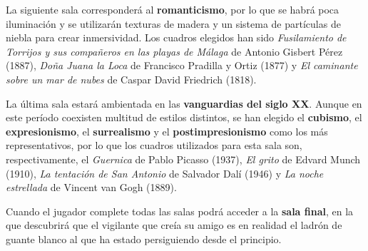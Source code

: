 La siguiente sala corresponderá al \textbf{romanticismo}, por lo que se habrá poca iluminación y se utilizarán texturas de madera y un sistema de partículas de niebla para crear inmersividad. Los cuadros elegidos han sido \textit{Fusilamiento de Torrijos y sus compañeros en las playas de Málaga} de Antonio Gisbert Pérez (1887), \textit{Doña Juana la Loca} de Francisco Pradilla y Ortiz (1877) y \textit{El caminante sobre un mar de nubes} de Caspar David Friedrich (1818).

La última sala estará ambientada en las \textbf{vanguardias del siglo XX}. Aunque en este período coexisten multitud de estilos distintos, se han elegido el \textbf{cubismo}, el \textbf{expresionismo}, el \textbf{surrealismo} y el \textbf{postimpresionismo} como los más representativos, por lo que los cuadros utilizados para esta sala son, respectivamente, el \textit{Guernica} de Pablo Picasso (1937), \textit{El grito} de Edvard Munch (1910), \textit{La tentación de San Antonio} de Salvador Dalí (1946) y \textit{La noche estrellada} de Vincent van Gogh (1889).

Cuando el jugador complete todas las salas podrá acceder a la \textbf{sala final}, en la que descubrirá que el vigilante que creía su amigo es en realidad el ladrón de guante blanco al que ha estado persiguiendo desde el principio.

